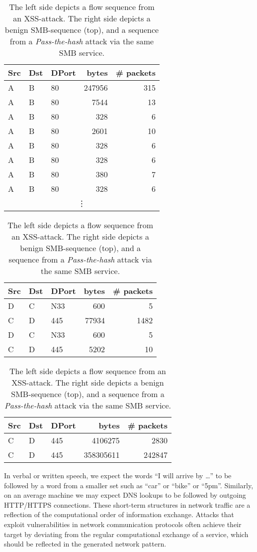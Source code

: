 \begin{table}[ht]
\centering
\begin{footnotesize}
\begin{subtable}{.47\textwidth}
\begin{tabular}{l l l r r}
Src&Dst&DPort&bytes&\# packets\\ \hline
A&B&80&247956&315\\ 
A&B&80&7544&13\\ 
A&B&80&328&6\\ 
A&B&80&2601&10\\ 
A&B&80&328&6\\ 
A&B&80&328&6\\ 
A&B&80&380&7\\
A&B&80&328&6\\
\multicolumn{5}{c}{\vdots}
\end{tabular}
\caption{XSS-attack, A=192.168.10.50, B= 172.16.0.1}\label{tabF:XSS}
\end{subtable}
\quad
\begin{subtable}{.47\textwidth}
\begin{tabular}{l l l r r}
Src&Dst&DPort&bytes&\# packets\\ \hline
D&C&N33&600&5\\ 
C&D&445&77934&1482\\ 
D&C&N33&600&5\\ 
C&D&445&5202&10\\  
\end{tabular}
\caption{Benign SMB, C=C6267, D=C754}\label{tabF:SMB}

\begin{tabular}{l l l r r}
Src&Dst&DPort&bytes&\# packets\\ \hline
C&D&445&4106275&2830\\ 
C&D&445&358305611&242847\\ 
\end{tabular}
\caption{\textit{Pass-the-hash} attack via SMB}\label{tabF:PTH}
\end{subtable}
\end{footnotesize}
\caption{The left side depicts a flow sequence from an XSS-attack.%
The right side depicts a benign SMB-sequence (top), and a sequence from a \textit{Pass-the-hash} attack via the same SMB service.}
\end{table}


In verbal or written speech, we expect the words ``I will arrive by \dots'' to be followed by a word from a smaller set such as ``car'' or ``bike'' or ``5pm''. 
Similarly, on an average machine we may expect DNS lookups 
to be followed by outgoing HTTP/HTTPS connections. %
These short-term structures in network traffic are a reflection of the computational order of information exchange. Attacks that exploit vulnerabilities in network communication protocols often achieve their target by deviating from the regular computational exchange of a service, which should be reflected in the generated network pattern. 


